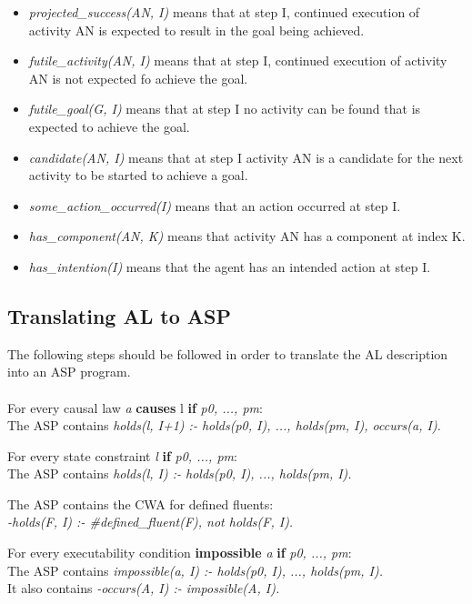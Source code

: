 \documentclass[11pt, oneside]{article}
\begin{document}
\begin{itemize}
\item \textit{projected\_success(AN, I)} means that at step I, continued execution of activity AN is expected to result in the goal being achieved.
\item \textit{futile\_activity(AN, I)} means that at step I, continued execution of activity AN is not expected fo achieve the goal.
\item \textit{futile\_goal(G, I)} means that at step I no activity can be found that is expected to achieve the goal.
\item \textit{candidate(AN, I)} means that at step I activity AN is a candidate for the next activity to be started to achieve a goal.
\item \textit{some\_action\_occurred(I)} means that an action occurred at step I.
\item \textit{has\_component(AN, K)} means that activity AN has a component at index K.
\item \textit{has\_intention(I)} means that the agent has an intended action at step I.
\end{itemize}



\subsection{Translating AL to ASP}
The following steps should be followed in order to translate the AL description into an ASP program.\\
\\
For every causal law \textit{a} \textbf{causes} l \textbf{if} \textit{p0, ..., pm}:\\
The ASP contains \textit{holds(l, I+1) :- holds(p0, I), ..., holds(pm, I), occurs(a, I).}\par

For every state constraint \textit{l} \textbf{if} \textit{p0, ..., pm}:\\
The ASP contains \textit{holds(l, I) :- holds(p0, I), ..., holds(pm, I).}\par

The ASP contains the CWA for defined fluents:\\
\textit{-holds(F, I) :- \#defined\_fluent(F), not holds(F, I).}\par

For every executability condition \textbf{impossible} \textit{a} \textbf{if} \textit{p0, ..., pm}:\\
The ASP contains \textit{impossible(a, I) :- holds(p0, I), ..., holds(pm, I).}\\
It also contains \textit{-occurs(A, I) :- impossible(A, I).}\par
\end{document}
